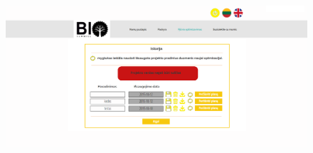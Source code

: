 \documentclass[a4paper,12pt]{article}
\begin{document}
\begin{figure}[!tph]
\hspace{-2cm}
\centering
\includegraphics[scale=0.45]{interfeisai/optimizavimoPuslapisPrisijungusIstorijaSuKlaida}
\label{fig:verticalcell}
\end{figure}

\clearpage
\end{document}
